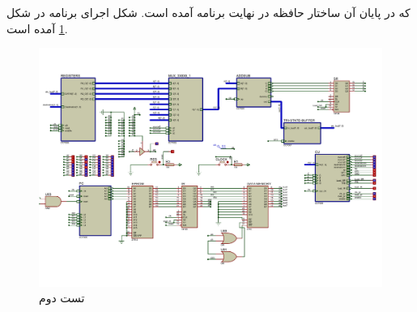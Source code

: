 \documentclass{article}
\begin{document}
که در پایان آن ساختار حافظه در نهایت برنامه آمده است. شکل اجرای برنامه در شکل  \ref{fig:test2} آمده است.

\begin{figure}
	\centering
	\includegraphics[scale=0.4,page=1]{./graphics/test2}
	\caption{تست دوم}
	\label{fig:test2}
\end{figure}
\end{document}
